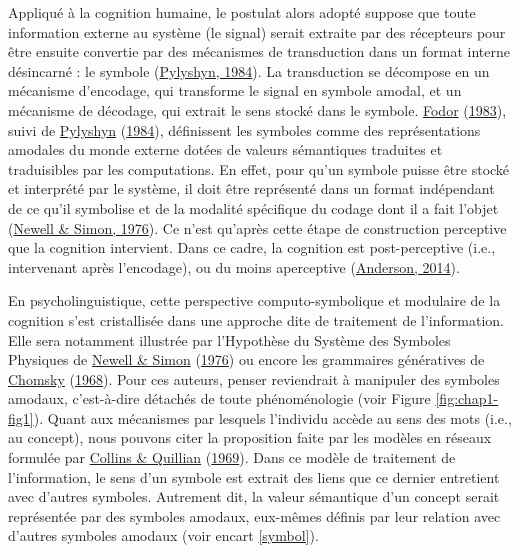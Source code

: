 \documentclass[
  a4paper,12pt,twoside,onecolumn,openright,final,oldfontcommands]{memoir}
\begin{document}
Appliqué à la cognition humaine, le postulat alors adopté suppose que toute information externe au système (le signal) serait extraite par des récepteurs pour être ensuite convertie par des mécanismes de transduction dans un format interne désincarné : le symbole (\protect\hyperlink{ref-pylyshyn_computation_1984}{Pylyshyn, 1984}). La transduction se décompose en un mécanisme d'encodage, qui transforme le signal en symbole amodal, et un mécanisme de décodage, qui extrait le sens stocké dans le symbole. \protect\hyperlink{ref-fodor_modularity_1983}{Fodor} (\protect\hyperlink{ref-fodor_modularity_1983}{1983}), suivi de \protect\hyperlink{ref-pylyshyn_computation_1984}{Pylyshyn} (\protect\hyperlink{ref-pylyshyn_computation_1984}{1984}), définissent les symboles comme des représentations amodales du monde externe dotées de valeurs sémantiques traduites et traduisibles par les computations. En effet, pour qu'un symbole puisse être stocké et interprété par le système, il doit être représenté dans un format indépendant de ce qu'il symbolise et de la modalité spécifique du codage dont il a fait l'objet (\protect\hyperlink{ref-newell_computer_1976}{Newell \& Simon, 1976}). Ce n'est qu'après cette étape de construction perceptive que la cognition intervient. Dans ce cadre, la cognition est post-perceptive (i.e., intervenant après l'encodage), ou du moins aperceptive (\protect\hyperlink{ref-anderson_after_2014}{Anderson, 2014}).

En psycholinguistique, cette perspective computo-symbolique et modulaire de la cognition s'est cristallisée dans une approche dite de traitement de l'information. Elle sera notamment illustrée par l'Hypothèse du Système des Symboles Physiques de \protect\hyperlink{ref-newell_computer_1976}{Newell \& Simon} (\protect\hyperlink{ref-newell_computer_1976}{1976}) ou encore les grammaires génératives de \protect\hyperlink{ref-chomsky_syntactic_1968}{Chomsky} (\protect\hyperlink{ref-chomsky_syntactic_1968}{1968}). Pour ces auteurs, penser reviendrait à manipuler des symboles amodaux, c'est-à-dire détachés de toute phénoménologie (voir Figure \ref{fig:chap1-fig1}). Quant aux mécanismes par lesquels l'individu accède au sens des mots (i.e., au concept), nous pouvons citer la proposition faite par les modèles en réseaux formulée par \protect\hyperlink{ref-collins_retrieval_1969}{Collins \& Quillian} (\protect\hyperlink{ref-collins_retrieval_1969}{1969}). Dans ce modèle de traitement de l'information, le sens d'un symbole est extrait des liens que ce dernier entretient avec d'autres symboles. Autrement dit, la valeur sémantique d'un concept serait représentée par des symboles amodaux, eux-mêmes définis par leur relation avec d'autres symboles amodaux (voir encart \ref{symbol}).
\end{document}
